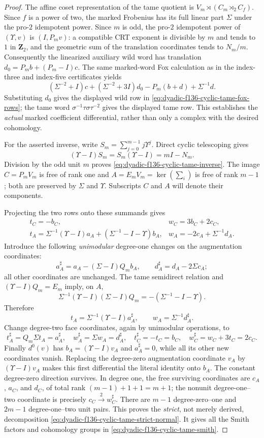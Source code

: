 \documentclass[11pt]{article}
\theoremstyle{definition}
\begin{document}
\begin{proof}
The affine coset representation of the tame quotient is
$V_m\rtimes(C_m\rtimes_2 C_f)$.  Since $f$ is a power of
two, the marked Frobenius has its full linear part $\Sigma$
under the pro-$2$ idempotent power.  Since $m$ is odd,
the pro-$2$ idempotent power of $(\Upsilon,v)$ is
$(I,P_m v)$: a compatible CRT exponent is divisible
by $m$ and tends to $1$ in $\mathbf Z_2$, and the
geometric sum of the translation coordinates tends
to $N_m/m$.  Consequently the linearized auxiliary
wild word has translation
$d_0=P_m b+(P_m-I)c$.  The same marked-word Fox
calculation as in the index-three and index-five
certificates yields
\[
(\Sigma^{-2}+I)c+(\Sigma^{-2}+3I)d_0
-P_m(b+d)+\Sigma^{-1}d.
\]
Substituting $d_0$ gives the displayed wild row in
\eqref{eq:dyadic-f136-cyclic-tame-fox-rows}; the
tame word $\sigma^{-1}\tau\sigma\tau^{-2}$ gives
the displayed tame row.  This establishes the
\emph{actual} marked coefficient differential,
rather than only a complex with the desired
cohomology.

For the asserted inverse, write
$S_m=\sum_{j=0}^{m-1}j\Upsilon^j$.  Direct cyclic
telescoping gives
\[
(\Upsilon-I)S_m=S_m(\Upsilon-I)=mI-N_m.
\]
Division by the odd unit $m$ proves
\eqref{eq:dyadic-f136-cyclic-tame-inverse}.
The image $C=P_mV_m$ is free of rank one and
$A=E_mV_m=\ker(\sum_i)$ is free of rank $m-1$;
both are preserved by $\Sigma$ and $\Upsilon$.
Subscripts $C$ and $A$ will denote their components.

Projecting the two rows onto these summands gives
\[
\begin{array}{ll}
t_C=-b_C,&w_C=3b_C+2c_C,\\[2pt]
t_A=\Sigma^{-1}(\Upsilon-I)a_A+
        (\Sigma^{-1}-I-\Upsilon)b_A,
&w_A=-2c_A+\Sigma^{-1}d_A.
\end{array}
\]
Introduce the following \emph{unimodular} degree-one
changes on the augmentation coordinates:
\[
a_A^\sharp=a_A-(\Sigma-I)Q_m b_A,\qquad
d_A^\sharp=d_A-2\Sigma c_A;
\]
all other coordinates are unchanged.  The tame
semidirect relation and
$(\Upsilon-I)Q_m=E_m$ imply, on $A$,
\[
\Sigma^{-1}(\Upsilon-I)(\Sigma-I)Q_m
   =-(\Sigma^{-1}-I-\Upsilon).
\]
Therefore
\[
t_A=\Sigma^{-1}(\Upsilon-I)a_A^\sharp,
\qquad
w_A=\Sigma^{-1}d_A^\sharp.
\]
Change degree-two face coordinates, again by
unimodular operations, to
\[
t_A^\sharp=Q_m\Sigma t_A=a_A^\sharp,\quad
w_A^\sharp=\Sigma w_A=d_A^\sharp,\quad
t_C^\sharp=-t_C=b_C,\quad
w_C^\sharp=w_C+3t_C=2c_C.
\]
Finally $d^0(v)$ has
$b_A=(\Upsilon-I)v_A$ and
$a_A^\sharp=0$, while all its other new
coordinates vanish.  Replacing the degree-zero
augmentation coordinate $v_A$ by
$(\Upsilon-I)v_A$ makes this first differential
the literal identity onto $b_A$.  The constant
degree-zero direction survives.  In degree one,
the free surviving coordinates are
$c_A$, $a_C$, and $d_C$, of total rank
$(m-1)+1+1=m+1$; the nonunit
degree-one--two coordinate is precisely
$c_C\xrightarrow{2}w_C^\sharp$.
There are $m-1$ degree-zero--one and
$2m-1$ degree-one--two unit pairs.  This proves
the \emph{strict}, not merely derived, decomposition
\eqref{eq:dyadic-f136-cyclic-tame-strict-normal}.
It gives all the Smith factors and cohomology
groups in \eqref{eq:dyadic-f136-cyclic-tame-smith}.


\end{proof}
\end{document}
